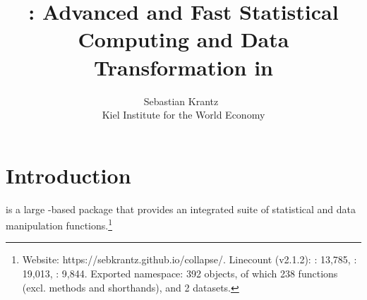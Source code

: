 \documentclass[nojss]{jss} %
\author{Sebastian Krantz~\orcidlink{0000-0001-6212-5229}\\Kiel Institute for the World Economy}
\title{\proglang{collapse}: Advanced and Fast Statistical Computing and Data Transformation in \proglang{R}} %
\begin{document}


\section[Introduction]{Introduction} \label{sec:intro}
%
\href{https://sebkrantz.github.io/collapse/}{} is a large -based  package that provides an integrated suite of statistical and data manipulation functions.\footnote{Website: https://sebkrantz.github.io/collapse/. Linecount (v2.1.2): : 13,785, : 19,013, : 9,844. \hphantom{aaa.}Exported namespace: 392 objects, of which 238 functions (excl. methods and shorthands), and 2 datasets.}
\end{document}
